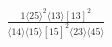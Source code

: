 \documentclass[varwidth, border=5pt]{standalone}
\begin{document}
\begin{my}
$\begin{gathered}
\scriptscriptstyle\frac{1⟨25⟩^2⟨13⟩[13]^2}{⟨14⟩⟨15⟩[15]^2⟨23⟩⟨45⟩}
\end{gathered}$
\end{my}
\end{document}
